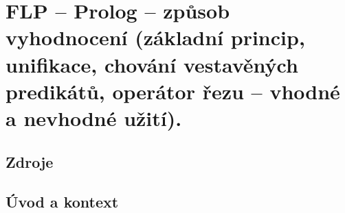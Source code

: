 

\graphicspath{{flp/prolog_zpusob_vyhodnoceni/figures}}


\chapter{FLP -- Prolog -- způsob vyhodnocení (základní princip, unifikace, chování vestavěných predikátů, operátor řezu -- vhodné a nevhodné užití).}


\section{Zdroje}

\begin{compactitem}
    \item {}
\end{compactitem}


\section{Úvod a kontext}

\begin{compactitem}
    \item {}
\end{compactitem}
